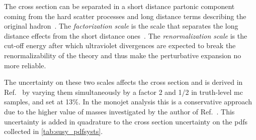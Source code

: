 The cross section can be separated in a short distance partonic component coming
from the hard scatter processes and long distance terms describing the original
hadron~\cite{FactorizationScale}. The \emph{factorization scale} is the scale
that separates the long distance effects from the short distance
ones~\cite{PerturbativeQCDHandbook}. The \emph{renormalization scale} is the
cut-off energy after which ultraviolet divergences are expected to break the
renormalizability of the theory and thus make the perturbative expansion no more
reliable.

The uncertainty on these two scales affects the cross section and is derived in
Ref.~\cite{SquarkGluinoTeam} by varying them simultaneously by a factor 2 and
1/2 in truth-level \gls{mc} samples, and set at 13\%. In the monojet analysis
this is a conservative approach due to the higher value of masses investigated
by the author of Ref.~\cite{SquarkGluinoTeam}. This uncertainty is added in
quadrature to the cross section uncertainty on the \glspl{pdf} collected in
\cref{tab:susy_pdfsysts}.


